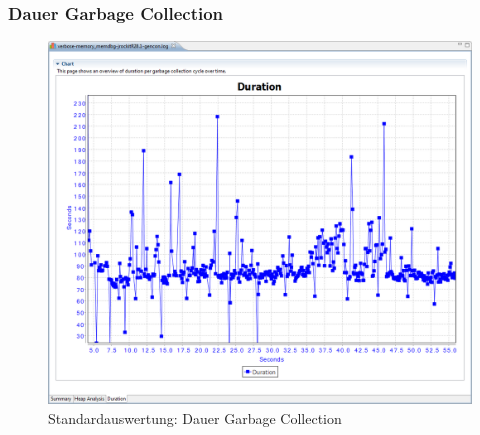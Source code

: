 \subsubsection{Dauer Garbage Collection}
 \begin{figure}[H]
  	\centering
    	\includegraphics[width=15cm]{images/tutorial_standardreport_duration}
        	\caption{Standardauswertung: Dauer Garbage Collection}
\end{figure}



